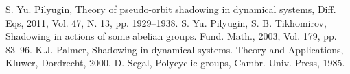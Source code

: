 \begin{thebibliography}{99}
       S. Yu. Pilyugin, Theory of pseudo-orbit shadowing in dynamical systems, Diff. Eqs, 2011, Vol. 47, N. 13, pp. 1929--1938.
            S. Yu. Pilyugin, S. B. Tikhomirov, Shadowing in actions of some abelian groups. Fund. Math., 2003, Vol. 179, pp. 83--96.
     K.J. Palmer, Shadowing in dynamical systems. Theory and Applications, Kluwer, Dordrecht, 2000.
         D. Segal, Polycyclic groups, Cambr. Univ. Press, 1985.
\end{thebibliography}
